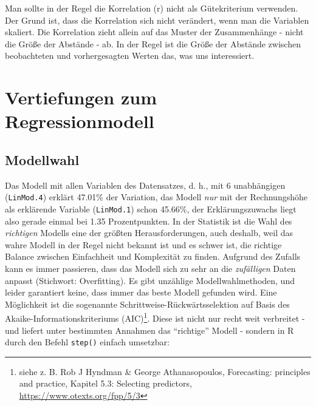 \documentclass[12pt,]{book}
\let\rmarkdownfootnote\footnote%
\def\footnote{\protect\rmarkdownfootnote}
\let\BeginKnitrBlock\begin \let\EndKnitrBlock\end
\begin{document}
\BeginKnitrBlock{rmdcaution}
Man sollte in der Regel die Korrelation (r) nicht als Gütekriterium
verwenden. Der Grund ist, dass die Korrelation sich nicht verändert,
wenn man die Variablen skaliert. Die Korrelation zieht allein auf das
Muster der Zusammenhänge - nicht die Größe der Abstände - ab. In der
Regel ist die Größe der Abstände zwischen beobachteten und
vorhergesagten Werten das, was uns interessiert.
\EndKnitrBlock{rmdcaution}

\section{Vertiefungen zum
Regressionmodell}\label{vertiefungen-zum-regressionmodell}

\subsection{Modellwahl}\label{modellwahl}

Das Modell mit allen Variablen des Datensatzes, d. h., mit 6
unabhängigen (\texttt{LinMod.4}) erklärt 47.01\% der Variation, das
Modell \emph{nur} mit der Rechnungshöhe als erklärende Variable
(\texttt{LinMod.1}) schon 45.66\%, der Erklärungszuwachs liegt also
gerade einmal bei 1.35 Prozentpunkten. In der Statistik ist die Wahl des
\emph{richtigen} Modells eine der größten Herausforderungen, auch
deshalb, weil das wahre Modell in der Regel nicht bekannt ist und es
schwer ist, die richtige Balance zwischen Einfachheit und Komplexität zu
finden. Aufgrund des Zufalls kann es immer passieren, dass das Modell
sich zu sehr an die \emph{zufälligen} Daten anpasst (Stichwort:
Overfitting). Es gibt unzählige Modellwahlmethoden, und leider
garantiert keine, dass immer das beste Modell gefunden wird. Eine
Möglichkeit ist die sogenannte Schrittweise-Rückwärtsselektion auf Basis
des Akaike-Informationskriteriums (AIC)\footnote{siehe z. B. Rob J
  Hyndman \& George Athanasopoulos, Forecasting: principles and
  practice, Kapitel 5.3: Selecting predictors,
  \url{https://www.otexts.org/fpp/5/3}}. Diese ist nicht nur recht weit
verbreitet - und liefert unter bestimmten Annahmen das ``richtige''
Modell - sondern in R durch den Befehl \texttt{step()} einfach
umsetzbar:
\end{document}
